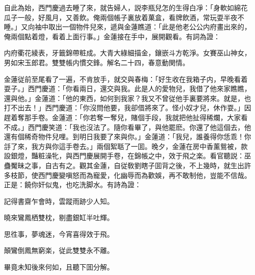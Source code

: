 自此為始，西門慶過去睡了來，就告婦人，説李瓶兒怎的生得白凈：「身軟如綿花瓜子一般，好風月，又善飲。俺兩個帳子裏放着菓盒，看牌飲酒，常玩耍半夜不睡。」又向袖中取出一個物件兒來，遞與金蓮瞧道：「此是他老公公内府畫出來的，俺兩個點着燈，看着上面行事。」金蓮接在手中，展開觀看。有詞為證：

\begin{myquote}
内府衢花綾表，牙籤錦帶粧成。大青大綠細描金，鑲嵌斗方乾淨。女賽巫山神女，男如宋玉郎君。雙雙帳内慣交鋒。解名二十四，春意動関情。
\end{myquote}

金蓮従前至尾看了一遍，不肯放手，就交與春梅：「好生收在我箱子内，早晚看着耍子。」西門慶道：「你看兩日，還交與我。此是人的愛物兒，我借了他來家瞧瞧，還與他。」金蓮道：「他的東西，如何到我家？我又不曾従他手裏要將來。就是，也打不出去！」西門慶道：「你沒問他要，我卻借將來了。怪小奴才兒，休作耍。」因趕着奪那手卷。金蓮道：「你若奪一奪兒，賭個手段，我就把他扯得稀爛，大家看不成。」西門慶笑道：「我也沒法了。隨你看畢了，與他罷麽。你還了他這個去，他還有個稀奇物件兒哩。到明日我要了來與你。」金蓮道：「我兒，誰養得你恁乖！你㧱了來，我方與你這手卷去。」兩個絮聒了一囬。晚夕，金蓮在房中香薰鴛被，款設銀燈，豔粧澡牝，與西門慶展開手卷，在錦帳之中，效于飛之楽。看官聽説：巫蠱魘昧之事，自古有之。觀其金蓮，自従敎劉瞎子囬背之後，不上幾時，就生出許多枝節，使西門慶變嗔怒而為寵愛，化幽辱而為歡娛，再不敢制他，豈能不信哉。正是：饒你奸似鬼，也吃洗脚水。有詩為證：

\begin{myquote}
記得書齋乍會時，雲蹤雨跡少人知。

曉來鸞鳳栖雙枕，剔盡銀缸半吐輝。

思徃事，夢魂迷，今宵喜得效于飛。

顛鸞倒鳳無窮楽，従此雙雙永不離。
\end{myquote}

畢竟未知後來何如，且聽下囬分解。

